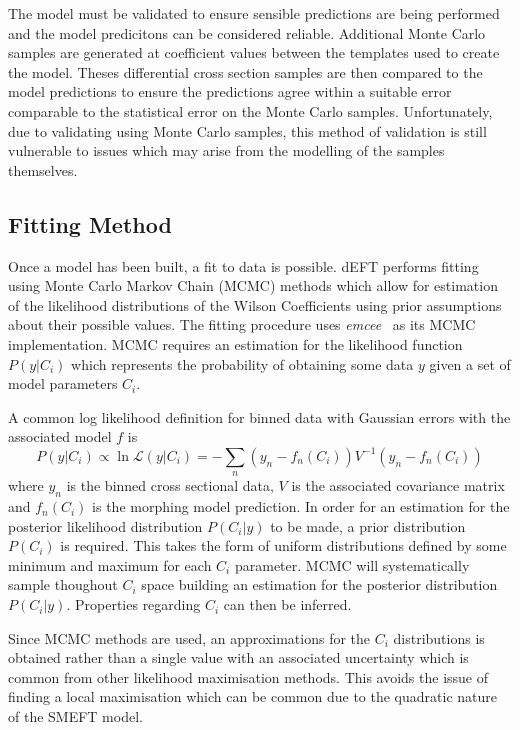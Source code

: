 \documentclass[a4paper,11pt]{article}
\begin{document}
The model must be validated to ensure sensible predictions are being performed and the model predicitons can be considered reliable.
Additional Monte Carlo samples are generated at coefficient values between the templates used to create the model.
Theses differential cross section samples are then compared to the model predictions to ensure the predictions agree within a suitable error comparable to the statistical error on the Monte Carlo samples.
Unfortunately, due to validating using Monte Carlo samples, this method of validation is still vulnerable to issues which may arise from the modelling of the samples themselves.

\subsection{Fitting Method}\label{sec:fitting}
Once a model has been built, a fit to data is possible.
dEFT performs fitting using Monte Carlo Markov Chain (MCMC) methods which allow for estimation of the likelihood distributions of the Wilson Coefficients using prior assumptions about their possible values.
The fitting procedure uses \emph{emcee}~\cite{Foreman_Mackey_2013} as its MCMC implementation.
MCMC requires an estimation for the likelihood function $P(y | C_{i})$ which represents the probability of obtaining some data $y$ given a set of model parameters $C_{i}$.

A common log likelihood definition for binned data with Gaussian errors with the associated model $f$ is
\begin{equation}
    P(y | C_{i}) \propto \ln\mathcal{L}(y | C_{i}) = -\sum\limits_{n} (y_{n} - f_{n}(C_{i})) V^{-1} (y_{n} - f_{n}(C_{i}))
\end{equation}
where $y_{n}$ is the binned cross sectional data, $V$ is the associated covariance matrix and $f_{n}(C_{i})$ is the morphing model prediction.
In order for an estimation for the posterior likelihood distribution $P(C_{i} | y)$ to be made, a prior distribution $P(C_{i})$ is required.
This takes the form of uniform distributions defined by some minimum and maximum for each $C_{i}$ parameter.
MCMC will systematically sample thoughout $C_{i}$ space building an estimation for the posterior distribution $P(C_{i}|y)$.
Properties regarding $C_{i}$ can then be inferred.

Since MCMC methods are used, an approximations for the $C_{i}$ distributions is obtained rather than a single value with an associated uncertainty which is common from other likelihood maximisation methods.
This avoids the issue of finding a local maximisation which can be common due to the quadratic nature of the SMEFT model.
\end{document}
